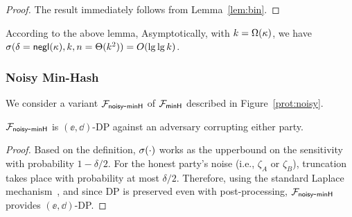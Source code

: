 \begin{proof} The result immediately follows from Lemma~\ref{lem:bin}.  \qedhere \end{proof}
%
According to the above lemma, Asymptotically,
with $k = \Omega(\kappa)$, we have $\sigma(\delta = \mathsf{negl}(\kappa), k, n =
\Theta(k^2)) = O(\lg\lg k)$. 
 
\subsubsection{Noisy Min-Hash}
We consider a variant ${\mathcal{F}_\mathsf{noisy\mbox{-}minH}}$ of ${\mathcal{F}_\mathsf{minH}}$ described in Figure~\ref{prot:noisy}. 

\setcounter{theorem}{0}
\begin{theorem}
    ${\mathcal{F}_\mathsf{noisy\mbox{-}minH}}$ is $(\ee, \dd)$-DP against an adversary corrupting either party. 
\end{theorem}
\begin{proof}
Based on the definition, $\mathsf{\sigma}(\cdot)$ works as the upperbound on the
sensitivity with probability $1-\delta/2$. For the honest party's noise (i.e., $\zeta_A$ or $\zeta_B$), truncation takes place with probability at most $\delta/2$. Therefore, using the standard Laplace
mechanism~\cite[Theorem 3.6]{dwork2014algorithmic}, and since DP is preserved even with post-processing, ${\mathcal{F}_\mathsf{noisy\mbox{-}minH}}$ provides
$(\ee, \dd)$-DP. 
\end{proof} 


